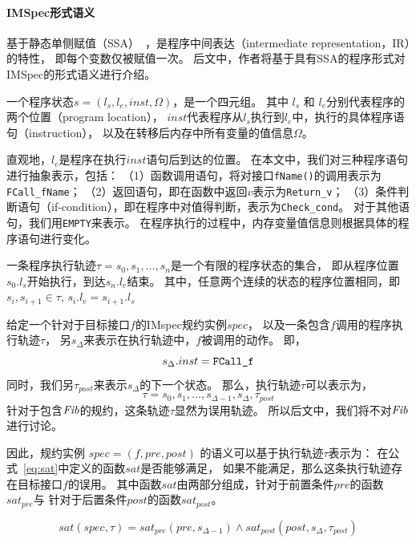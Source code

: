 \paragraph{IMSpec形式语义}
基于静态单侧赋值（SSA）~\cite{ssa}，是程序中间表达（intermediate representation，IR）的特性，
即每个变数仅被赋值一次。
后文中，作者将基于具有SSA的程序形式对IMSpec的形式语义进行介绍。

\begin{definition}[程序状态]
	一个程序状态$s = (l_s, l_e, inst, \Omega)$，是一个四元组。
	其中 $l_s$ 和 $l_e$分别代表程序的两个位置（program location）， 
	$inst$代表程序从$l_s$执行到$l_e$中，执行的具体程序语句（instruction），
	以及在转移后内存中所有变量的值信息$\Omega$。
\end{definition}

直观地，$l_e$是程序在执行$inst$语句后到达的位置。
在本文中，我们对三种程序语句进行抽象表示，包括：
（1）函数调用语句，将对接口\texttt{fName()}的调用表示为\texttt{FCall\_fName}；
（2）返回语句，即在函数中返回$v$表示为\texttt{Return\_v}；
（3）条件判断语句（if-condition），即在程序中对值得判断，表示为\texttt{Check\_cond}。
对于其他语句，我们用\texttt{EMPTY}来表示。
在程序执行的过程中，内存变量值信息则根据具体的程序语句进行变化。

\begin{definition}[执行轨迹]
	一条程序执行轨迹$\tau = s_0, s_1, \dots, s_n$是一个有限的程序状态的集合，
	即从程序位置$s_0.l_s$开始执行，到达$s_n.l_e$结束。
	其中，任意两个连续的状态的程序位置相同，即$s_i, s_{i+1} \in \tau$, $s_i.l_e = s_{i+1}.l_s$
\end{definition}

给定一个针对于目标接口$f$的IMspec规约实例$\mathit{spec}$，
以及一条包含$f$调用的程序执行轨迹$\tau$，
另$s_{\Delta}$来表示在执行轨迹中，$f$被调用的动作。
即，$$s_{\Delta}.inst = \text{\texttt{FCall\_f}}$$
同时，我们另$\tau_{post}$来表示$s_{\Delta}$的下一个状态。
那么，执行轨迹$\tau$可以表示为，
$$\tau = s_0, s_1, \dots, s_{\Delta-1}, s_{\Delta}, \tau_{post}$$
针对于包含$\mathit{Fib}$的规约，这条轨迹$\tau$显然为误用轨迹。
所以后文中，我们将不对$\mathit{Fib}$进行讨论。

因此，规约实例
$\mathit{spec} = (f, \mathit{pre}, \mathit{post})$
的语义可以基于执行轨迹$\tau$表示为：
在公式~\ref{eq:sat}中定义的函数$sat$是否能够满足，
如果不能满足，那么这条执行轨迹存在目标接口$f$的误用。
其中函数$sat$由两部分组成，针对于前置条件$\mathit{pre}$的函数$sat_{pre}$与
针对于后置条件$\mathit{post}$的函数$sat_{post}$。

\begin{equation}
\label{eq:sat}
sat(\textit{spec}, \tau) = 
sat_{pre}(\mathit{pre},
s_{\Delta-1}) \wedge sat_{post}(\mathit{post},s_{\Delta},\tau_{post})
\end{equation}

